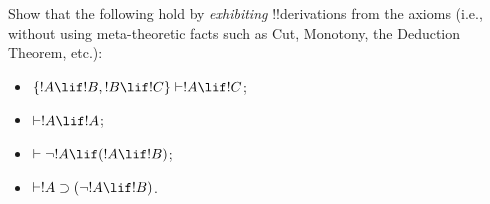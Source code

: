 \documentclass[../../include/open-logic-section]{subfiles}
\begin{document}


\begin{prob}
Show that the following hold by \emph{exhibiting} !!{derivation}s from the
axioms (i.e., without using meta-theoretic facts such as Cut,
  Monotony, the Deduction Theorem, etc.):
  \begin{itemize}
  \item $\{!A\lif !B, !B\lif !C\} \Proves !A\lif !C$;
  \item $\Proves !A \lif !A$;
  \item $\Proves \lnot !A \lif (!A \lif !B)$;
  \item $\Proves !A \supset (\lnot !A \lif !B)$.
 \end{itemize}
\end{prob}
\end{document}
